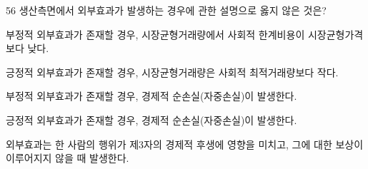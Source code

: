 \begin{question}{56}
생산측면에서 외부효과가 발생하는 경우에 관한 설명으로 옳지 않은 것은?
\begin{choices}
  \item 부정적 외부효과가 존재할 경우, 시장균형거래량에서 사회적 한계비용이 시장균형가격보다 낮다.
  \item 긍정적 외부효과가 존재할 경우, 시장균형거래량은 사회적 최적거래량보다 작다.
  \item 부정적 외부효과가 존재할 경우, 경제적 순손실(자중손실)이 발생한다.
  \item 긍정적 외부효과가 존재할 경우, 경제적 순손실(자중손실)이 발생한다.
  \item 외부효과는 한 사람의 행위가 제3자의 경제적 후생에 영향을 미치고, 그에 대한 보상이 이루어지지 않을 때 발생한다.
\end{choices}
\end{question}
